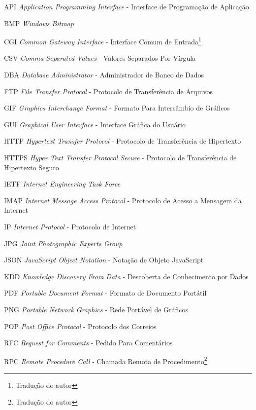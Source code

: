
\begin{siglas}
	\item[API] \textit{Application Programming Interface} - Interface de Programação de Aplicação
	\item[BMP] \textit{Windows Bitmap}
	\item[CGI] \textit{Common Gateway Interface} - Interface Comum de Entrada\footnote{Tradução do autor}
	\item[CSV] \textit{Comma-Separated Values} - Valores Separados Por Vírgula\footnotemark[1]
	\item[DBA] \textit{Database Administrator} - Administrador de Banco de Dados
	\item[FTP] \textit{File Transfer Protocol} - Protocolo de Transferência de Arquivos
	\item[GIF] \textit{Graphics Interchange Format} - Formato Para Intercâmbio de Gráficos\footnotemark[1]
	\item[GUI] \textit{Graphical User Interface} - Interface Gráfica do Usuário
	\item[HTTP] \textit{Hypertext Transfer Protocol} - Protocolo de Transferência de Hipertexto
	\item[HTTPS] \textit{Hyper Text Transfer Protocol Secure} - Protocolo de Transferência de Hipertexto Seguro
	\item[IETF] \textit{Internet Engineering Task Force}
	\item[IMAP] \textit{Internet Message Access Protocol} - Protocolo de Acesso a Mensagem da Internet
	\item[IP] \textit{Internet Protocol} - Protocolo de Internet
	\item[JPG] \textit{Joint Photographic Experts Group}
	\item[JSON] \textit{JavaScript Object Notation} - Notação de Objeto JavaScript\footnotemark[1] 
	\item[KDD] \textit{Knowledge Discovery From Data} - Descoberta de Conhecimento por Dados
	\item[PDF] \textit{Portable Document Format} - Formato de Documento Portátil\footnotemark[1]
	\item[PNG] \textit{Portable Network Graphics} - Rede Portável de Gráficos\footnotemark[1]
	\item[POP] \textit{Post Office Protocol} - Protocolo dos Correios
	\item[RFC] \textit{Request for Comments} - Pedido Para Comentários
	\item[RPC] \textit{Remote Procedure Call} - Chamada Remota de Procedimento\footnote{Tradução do autor}

\end{siglas}

